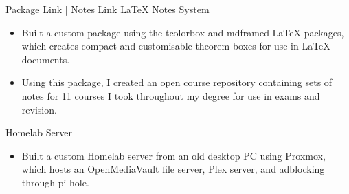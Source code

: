 \documentclass[../../cv-cs.tex]{subfiles}
\begin{document}
%
\cvlinkevent
{\href{https:www.github.com/leon0241/leon-latex-thmboxes}{Package Link} | \href{https:www.github.com/leon0241/leon-latex-notes}{Notes Link}}
{LaTeX Notes System}
{
    \begin{itemize}
	\item Built a custom package using the tcolorbox and mdframed LaTeX packages, which creates compact and customisable theorem boxes for use in LaTeX documents.
	\item Using this package, I created an open course repository containing sets of notes for 11 courses I took throughout my degree for use in exams and revision.
    \end{itemize}
}

\cvlinkevent
{}
{Homelab Server}
{
    \begin{itemize}
	\item Built a custom Homelab server from an old desktop PC using Proxmox, which hosts an OpenMediaVault file server, Plex server, and adblocking through pi-hole.
    \end{itemize}
}
\end{document}
